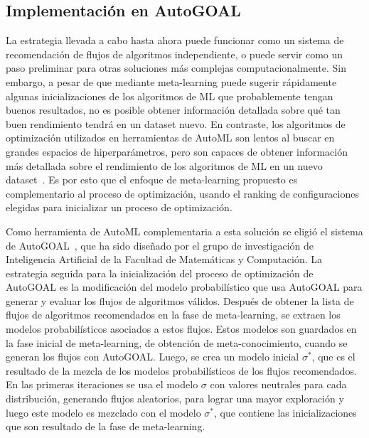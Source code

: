 \documentclass[a4paper,12pt]{article}
\begin{document}
\subsection{Implementación en AutoGOAL}

La estrategia llevada a cabo hasta ahora puede funcionar como un sistema de recomendación de flujos de algoritmos independiente, o puede servir como un paso preliminar para otras soluciones más complejas computacionalmente. Sin embargo, a pesar de que mediante meta-learning puede sugerir rápidamente algunas inicializaciones de los algoritmos de ML que probablemente tengan buenos resultados, no es posible obtener información detallada sobre qué tan buen rendimiento tendrá en un dataset nuevo. En contraste, los algoritmos de optimización utilizados en herramientas de AutoML son lentos al buscar en grandes espacios de hiperparámetros, pero son capaces de obtener información más detallada sobre el rendimiento de los algoritmos de ML en un nuevo dataset~\cite{fuerer2015efficient}. Es por esto que el enfoque de meta-learning propuesto es complementario al proceso de optimización, usando el ranking de configuraciones elegidas para inicializar un proceso de optimización.

Como herramienta de AutoML complementaria a esta solución se eligió el sistema de AutoGOAL~\cite{autogoal}, que ha sido diseñado por el grupo de investigación de Inteligencia Artificial de la Facultad de Matemáticas y Computación. La estrategia seguida para la inicialización del proceso de optimización de AutoGOAL es la modificación del modelo probabilístico que usa AutoGOAL para generar y evaluar los flujos de algoritmos válidos. Después de obtener la lista de flujos de algoritmos recomendados en la fase de meta-learning, se extraen los modelos probabilísticos asociados a estos flujos. Estos modelos son guardados en la fase inicial de meta-learning, de obtención de meta-conocimiento, cuando se generan los flujos con AutoGOAL. Luego, se crea un modelo inicial $\sigma^*$, que es el resultado de la mezcla de los modelos probabilísticos de los flujos recomendados. En las primeras iteraciones se usa el modelo $\sigma$ con valores neutrales para cada distribución, generando flujos aleatorios, para lograr una mayor exploración y luego este modelo es mezclado con el modelo $\sigma^*$, que contiene las inicializaciones que son resultado de la fase de meta-learning.

\end{document}
